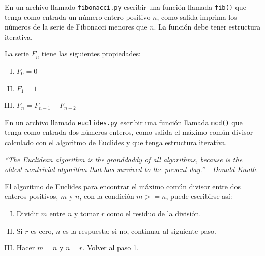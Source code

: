 \documentclass[11pt,letterpaper]{exam}
\begin{document}
\begin{questions}

 En un archivo llamado \verb"fibonacci.py" 
escribir una función llamada \verb"fib()" que tenga como entrada un número entero 
positivo $n$, como salida imprima los números de la serie de Fibonacci menores que 
$n$. La función debe tener estructura iterativa.

\medskip
La serie $F_n$ tiene las siguientes propiedades:
\begin{enumerate}[I.)]
	\item $F_0 = 0$
	\item $F_1 = 1$
	\item $F_n = F_{n-1} +F_{n-2}$
\end{enumerate}

En un archivo llamado \verb"euclides.py"  escribir una función llamada \verb"mcd()"
que tenga como entrada dos números enteros, como salida el máximo común divisor
calculado con el algoritmo de Euclides y que tenga estructura iterativa.

\medskip
\textit{``The Euclidean algorithm is the granddaddy of all algorithms, because is
the oldest nontrivial algorithm that has survived to the present day.'' - Donald
Knuth}.
\medskip

El algoritmo de Euclides para encontrar el máximo común divisor entre dos 
enteros positivos, $m$ y $n$, con la condición $m>=n$, puede escribirse así:

\begin{enumerate}[I.)]
	\item Dividir $m$ entre $n$ y tomar $r$ como el residuo de la división.

	\item Si $r$ es cero, $n$ es la respuesta; si no, continuar al siguiente paso.

	\item Hacer $m=n$ y $n=r$. Volver al paso 1.
\end{enumerate}

\end{questions}
\end{document}
